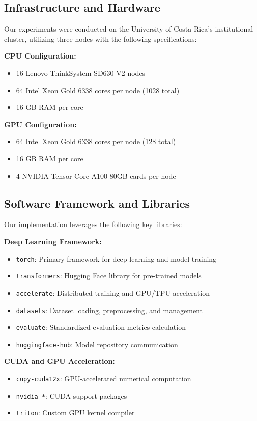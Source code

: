 \documentclass[../main.tex]{subfiles}
\begin{document}
\subsection{Infrastructure and Hardware}

Our experiments were conducted on the University of Costa Rica's institutional cluster, utilizing three nodes with the following specifications:

\textbf{CPU Configuration:}
\begin{itemize}
\item 16 Lenovo ThinkSystem SD630 V2 nodes
\item 64 Intel Xeon Gold 6338 cores per node (1028 total)
\item 16 GB RAM per core
\end{itemize}

\textbf{GPU Configuration:}
\begin{itemize}
\item 64 Intel Xeon Gold 6338 cores per node (128 total)
\item 16 GB RAM per core
\item 4 NVIDIA Tensor Core A100 80GB cards per node
\end{itemize}

\subsection{Software Framework and Libraries}

Our implementation leverages the following key libraries:

\textbf{Deep Learning Framework:}
\begin{itemize}
\item \texttt{torch}: Primary framework for deep learning and model training
\item \texttt{transformers}: Hugging Face library for pre-trained models
\item \texttt{accelerate}: Distributed training and GPU/TPU acceleration
\item \texttt{datasets}: Dataset loading, preprocessing, and management
\item \texttt{evaluate}: Standardized evaluation metrics calculation
\item \texttt{huggingface-hub}: Model repository communication
\end{itemize}

\textbf{CUDA and GPU Acceleration:}
\begin{itemize}
\item \texttt{cupy-cuda12x}: GPU-accelerated numerical computation
\item \texttt{nvidia-*}: CUDA support packages
\item \texttt{triton}: Custom GPU kernel compiler
\end{itemize}
\end{document}
